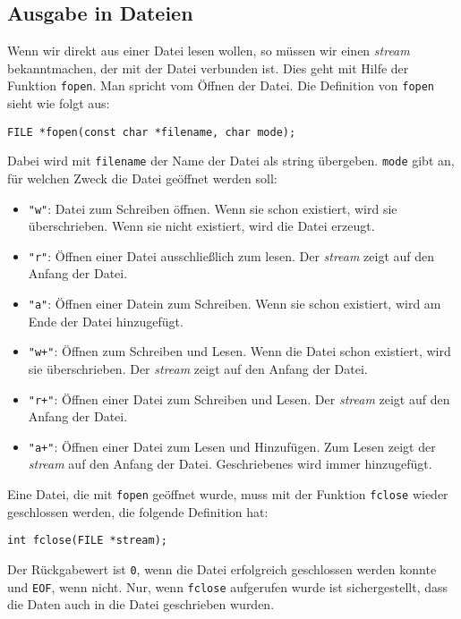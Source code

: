 \subsection{Ausgabe in Dateien}

Wenn wir direkt aus einer Datei lesen wollen, so müssen wir einen \emph{stream} bekanntmachen, der mit der Datei verbunden ist.
Dies geht mit Hilfe der Funktion \verb|fopen|.
Man spricht vom Öffnen der Datei.
Die Definition von \texttt{fopen} sieht wie folgt aus:
\begin{lstlisting}
FILE *fopen(const char *filename, char mode);
\end{lstlisting}
Dabei wird mit \texttt{filename} der Name der Datei als string übergeben.
\texttt{mode} gibt an, für welchen Zweck die Datei geöffnet werden soll:
\begin{itemize} 
  \itemsep0.5ex
\item \texttt{"w"}: Datei zum Schreiben öffnen. Wenn sie schon existiert, wird sie überschrieben. Wenn sie nicht existiert, wird die Datei erzeugt.
\item \texttt{"r"}: Öffnen einer Datei ausschließlich zum lesen. Der \emph{stream} zeigt auf den Anfang der Datei.
\item \texttt{"{}a"}: Öffnen einer Datein zum Schreiben. Wenn sie schon existiert, wird am Ende der Datei hinzugefügt.
\item \texttt{"w+"}: Öffnen zum Schreiben und Lesen. Wenn die Datei schon existiert, wird sie überschrieben. Der \emph{stream} zeigt auf den Anfang der Datei.
\item \texttt{"r+"}: Öffnen einer Datei zum Schreiben und Lesen. Der \emph{stream} zeigt auf den Anfang der Datei.
\item \texttt{"{}a+"}: Öffnen einer Datei zum Lesen und Hinzufügen. Zum Lesen zeigt der \emph{stream} auf den Anfang der Datei. Geschriebenes wird immer hinzugefügt.
\end{itemize}
Eine Datei, die mit \texttt{fopen} geöffnet wurde, muss mit der Funktion \texttt{fclose} wieder geschlossen werden, die folgende Definition hat:
\begin{lstlisting}
int fclose(FILE *stream);
\end{lstlisting}
Der Rückgabewert ist \texttt{0}, wenn die Datei erfolgreich geschlossen werden konnte und \texttt{EOF}, wenn nicht.
Nur, wenn \texttt{fclose} aufgerufen wurde ist sichergestellt, dass die Daten auch in die Datei geschrieben wurden.

